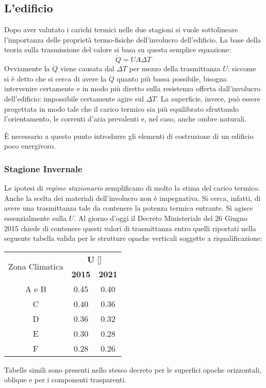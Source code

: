 \subsection{L'edificio}
Dopo aver valutato i carichi termici nelle due stagioni si vuole sottolineare l'importanza delle proprietà termo-fisiche dell'involucro dell'edificio.
La base della teoria sulla trasmissione del calore si basa su questa semplice equazione:
\begin{equation}
	\dot{Q}=UA\Delta T
\end{equation}
Ovviamente la $\dot{Q}$ viene causata dal $\Delta T$ per mezzo della trasmittanza $U$: siccome si è detto che si cerca di avere la $\dot{Q}$ quanto più bassa possibile, bisogna intervenire certamente e in modo più diretto sulla resistenza offerta dall'involucro dell'edificio: impossibile certamente agire sul $\Delta T$. La superficie, invece, può essere progettata in modo tale che il carico termico sia più equilibrato sfruttando l'orientamento, le correnti d'aria prevalenti e, nel caso, anche ombre naturali.

È necessario a questo punto introdurre gli elementi di costruzione di un edificio poco energivoro.

\subsubsection{Stagione Invernale}
Le ipotesi di \emph{regime stazionario} semplificano di molto la stima del carico termico. Anche la scelta dei materiali dell'involucro non è impegnativa. Si cerca, infatti, di avere una trasmittanza tale da contenere la potenza termica entrante. Si agisce essenzialmente sulla $U$. Al giorno d'oggi il Decreto Ministeriale del 26 Giugno 2015 chiede di contenere questi valori di trasmittanza entro quelli riportati nella seguente tabella valida per le strutture opache verticali soggette a riqualificazione:
\begin{center}
	\begin{tabular}{ccc}
		\multirow{2}{*}{Zona Climatica} & \multicolumn{2}{c}{\textbf{U} [\trasm]}	\\
		\cmidrule(lr){2-3}
										& \textbf{2015} & \textbf{2021}				\\
		\midrule
		A e B							&	0.45		&	0.40 					\\
		C								& 	0.40		&	0.36					\\
		D								&	0.36		&	0.32					\\
		E								&	0.30		&	0.28					\\
		F								&	0.28		&	0.26					\\
	\end{tabular}
\end{center}
Tabelle simili sono presenti nello stesso decreto per le superfici opache orizzontali, oblique e per i componenti trasparenti.

